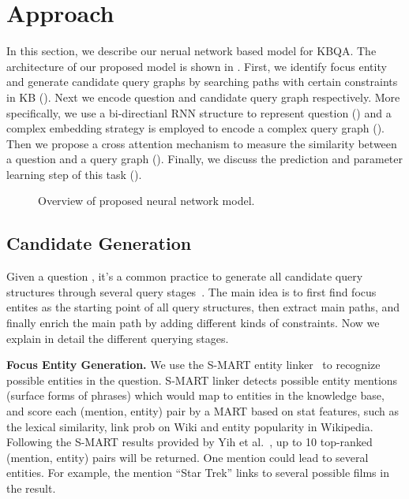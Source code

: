 \section{Approach}

In this section, we describe our nerual network based model for KBQA. The architecture of our proposed model is shown in . First, we identify focus entity and generate candidate query graphs by searching paths with certain constraints in KB (). Next we encode question and candidate query graph respectively. 
More specifically, we use a bi-directianl RNN structure to represent question () and a complex embedding strategy is employed to encode a complex query graph (). Then we propose a cross attention mechanism to measure the similarity between a question and a query graph (). Finally, we discuss the prediction and parameter learning step of this task ().


\begin{figure*}
	\centering
	\caption{Overview of proposed neural network model.}
	\label{fig:overview}
\end{figure*}
 

\subsection{Candidate Generation}
\label{sec:candgen}


Given a question , it's a common practice to generate all candidate query structures through several
query stages~\cite{yih2015,bao2016}.
The main idea is to first find focus entites as the starting point of all query structures,
then extract main paths, and finally enrich the main path by adding different kinds of constraints.
Now we explain in detail the different querying stages.

\textbf{Focus Entity Generation.}
We use the S-MART entity linker~\cite{yang2015} to recognize possible entities in the question.
S-MART linker detects possible entity mentions (surface forms of phrases) which would map to entities in the knowledge base,
and score each (mention, entity) pair by a MART based on stat features, such as the lexical similarity,
link prob on Wiki and entity popularity in Wikipedia.
Following the S-MART results provided by Yih et al.~,
up to 10 top-ranked (mention, entity) pairs will be returned.
One mention could lead to several entities.
For example, the mention ``Star Trek'' links to several possible films in the result.

